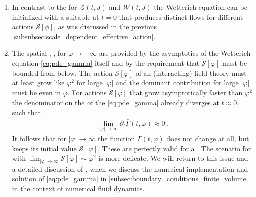 \begin{enumerate}
	\item	In contrast to the \pdes{} for $\mathcal{Z} ( t, J )$ and $\mathcal{W} ( t, J )$ the Wetterich equation can be initialized with a suitable \ic{} at $t = 0$ that produces distinct flows for different actions $\mathcal{S}[\phi]$, as was discussed in the previous \cref{subsubsec:scale_dependent_effective_action}.
	
	\item	The spatial \bcs{}, \ie{}, for $\varphi \rightarrow \pm \infty$ are provided by the asymptotics of the Wetterich equation \eqref{eq:pde_gamma} itself and by the requirement that $\mathcal{S} [ \varphi ]$ must be bounded from below: The action $\mathcal{S} [ \varphi ]$ of an (interacting) field theory must at least grow like $\varphi^2$ for large $| \varphi |$ and the dominant contribution for large $| \varphi |$ must be even in $\varphi$.
	For actions $\mathcal{S} [ \varphi ]$ that grow asymptotically faster than $\varphi^2$ the denominator on the \rhs{} of the \pde{} \eqref{eq:pde_gamma} already diverges at $t \approx 0$, such that
	\begin{align}
		\lim\limits_{| \varphi | \rightarrow \infty} \partial_t \bar{\Gamma} ( t, \varphi ) \approx 0 \, .
	\end{align}
	It follows that for $| \varphi | \rightarrow \infty$ the function $\bar{\Gamma} ( t, \varphi )$ does not change at all, but keeps its initial value $\mathcal{S} [ \varphi ]$.
	These are perfectly valid \bcs{} for a \pde.
	The scenario for \ics{} with $\lim_{| \varphi | \rightarrow \infty} \mathcal{S} [ \varphi ] \sim \varphi^2$ is more delicate.
	We will return to this issue and a detailed discussion of \bcs{}, when we discuss the numerical implementation and solution of \cref{eq:pde_gamma} in \cref{subsec:boundary_conditions_finite_volume} in the context of numerical fluid dynamics.
	

\end{enumerate}
